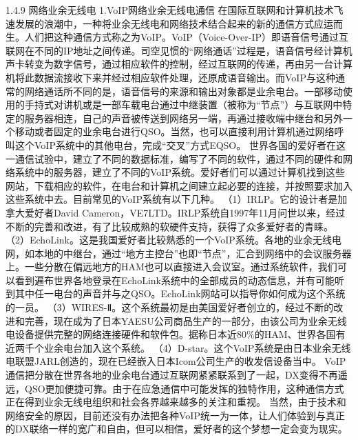 \documentclass[12pt,UTF8]{ctexbook}
\begin{document}
1.4.9 网络业余无线电
1.VoIP网络业余无线电通信
在国际互联网和计算机技术飞速发展的浪潮中，一种将业余无线电和网络技术结合起来的新的通信方式应运而生。人们把这种通信方式称之为VoIP。VoIP（Voice-Over-IP）即语音信号通过互联网在不同的IP地址之间传递。司空见惯的“网络通话”过程是，语音信号经计算机声卡转变为数字信号，通过相应软件的控制，经过互联网的传递，再由另一台计算机将此数据流接收下来并经过相应软件处理，还原成语音输出。而VoIP与这种通常的网络通话所不同的是，语音信号的来源和输出对象都是业余电台。一部移动使用的手持式对讲机或是一部车载电台通过中继装置（被称为“节点”）与互联网中特定的服务器相连，自己的声音被传送到网络另一端，再通过接收端中继台和另外一个移动或者固定的业余电台进行QSO。当然，也可以直接利用计算机通过网络呼叫这个VoIP系统中的其他电台，完成“交叉”方式EQSO。
世界各国的爱好者在这一通信试验中，建立了不同的数据标准，编写了不同的软件，通过不同的硬件和网络系统中的服务器，建立了不同的VoIP系统。爱好者们可以通过计算机找到这些网站，下载相应的软件，在电台和计算机之间建立起必要的连接，并按照要求加入这些系统中去。目前常见的VoIP系统有以下几种。
（1）IRLP。它的设计者是加拿大爱好者David Cameron，VE7LTD。IRLP系统自1997年11月问世以来，经过不断的完善和改进，有了比较成熟的软硬件支持，获得了众多爱好者的青睐。
（2）EchoLink。这是我国爱好者比较熟悉的一个VoIP系统。各地的业余无线电网，如本地的中继台，通过“地方主控台”也即“节点”，汇合到网络中的会议服务器上。一些分散在偏远地方的HAM也可以直接进入会议室。通过系统软件，我们可以看到遍布世界各地登录在EchoLink系统中的全部成员的动态信息，并有可能听到其中任一电台的声音并与之QSO。EchoLink网站可以指导你如何成为这个系统的一员。
（3）WIRES-Ⅱ。这个系统最初是由美国爱好者创立的，经过不断的改进和完善，现在成为了日本YAESU公司商品生产的一部分，由该公司为业余无线电设备提供完整的网络连接硬件和软件包。据称日本近80\%的HAM、世界各国有近两千个业余电台加入这个系统。
（4）D-star。这个VoIP系统是由日本业余无线电联盟JARL创造的，现在已经嵌入日本Icom公司生产的收发信设备当中。
VoIP通信把分散在世界各地的业余电台通过互联网紧紧联系到了一起，DX变得不再遥远，QSO更加便捷可靠。由于在应急通信中可能发挥的独特作用，这种通信方式正在得到业余无线电组织和社会各界越来越多的关注和重视。
当然，由于技术和网络安全的原因，目前还没有办法把各种VoIP统一为一体，让人们体验到与真正的DX联络一样的宽广和自由，但可以相信，爱好者的这个梦想一定会变为现实。
\end{document}

